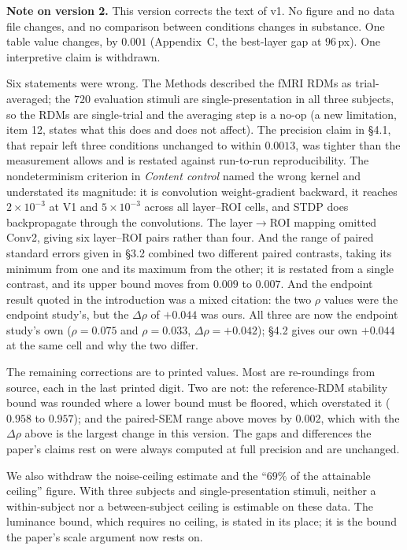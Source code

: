 \documentclass[10pt,twocolumn]{article}
\providecommand{\DIFaddend}{} %
\DeclareRobustCommand{\DIFaddend}{\DIFOaddend \let\includegraphics\DIFOincludegraphics} %
\begin{document}
\DIFaddend \textbf{Note on version 2.} This version corrects the text of v1. No figure and no data file changes, and no comparison between conditions changes in substance. One table value changes, by $0.001$ (Appendix~C, the best-layer gap at $96$\,px). One interpretive claim is withdrawn.

Six statements were wrong. The Methods described the fMRI RDMs as trial-averaged; the $720$ evaluation stimuli are single-presentation in all three subjects, so the RDMs are single-trial and the averaging step is a no-op (a new limitation, item 12, states what this does and does not affect). The precision claim in \S4.1, that repair left three conditions unchanged to within $0.0013$, was tighter than the measurement allows and is restated against run-to-run reproducibility. The nondeterminism criterion in \emph{Content control} named the wrong kernel and understated its magnitude: it is convolution weight-gradient backward, it reaches $2\times10^{-3}$ at V1 and $5\times10^{-3}$ across all layer--ROI cells, and STDP does backpropagate through the convolutions. The layer$\to$ROI mapping omitted Conv2, giving six layer--ROI pairs rather than four. And the range of paired standard errors given in \S3.2 combined two different paired contrasts, taking its minimum from one and its maximum from the other; it is restated from a single contrast, and its upper bound moves from $0.009$ to $0.007$. And the endpoint result quoted in the introduction was a mixed citation: the two $\rho$ values were the endpoint study's, but the $\Delta\rho$ of $+0.044$ was ours. All three are now the endpoint study's own ($\rho = 0.075$ and $\rho = 0.033$, $\Delta\rho = +0.042$); \S4.2 gives our own $+0.044$ at the same cell and why the two differ.

The remaining corrections are to printed values. Most are re-roundings from source, each in the last printed digit. Two are not: the reference-RDM stability bound was rounded where a lower bound must be floored, which overstated it ($0.958$ to $0.957$); and the paired-SEM range above moves by $0.002$, which with the $\Delta\rho$ above is the largest change in this version. The gaps and differences the paper's claims rest on were always computed at full precision and are unchanged.

We also withdraw the noise-ceiling estimate and the ``$69\%$ of the attainable ceiling'' figure. With three subjects and single-presentation stimuli, neither a within-subject nor a between-subject ceiling is estimable on these data. The luminance bound, which requires no ceiling, is stated in its place; it is the bound the paper's scale argument now rests on.
\end{document}

